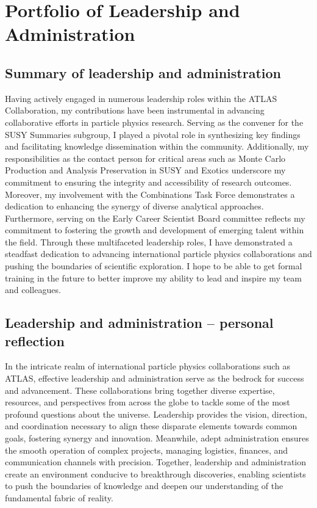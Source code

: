 \chapter{Portfolio of Leadership and Administration}

\section{Summary of leadership and administration} \label{sec:summary-of-leadership-and-administration}

Having actively engaged in numerous leadership roles within the ATLAS Collaboration, my contributions have been instrumental in advancing collaborative efforts in particle physics research. Serving as the convener for the SUSY Summaries subgroup, I played a pivotal role in synthesizing key findings and facilitating knowledge dissemination within the community. Additionally, my responsibilities as the contact person for critical areas such as Monte Carlo Production and Analysis Preservation in SUSY and Exotics underscore my commitment to ensuring the integrity and accessibility of research outcomes. Moreover, my involvement with the Combinations Task Force demonstrates a dedication to enhancing the synergy of diverse analytical approaches. Furthermore, serving on the Early Career Scientist Board committee reflects my commitment to fostering the growth and development of emerging talent within the field. Through these multifaceted leadership roles, I have demonstrated a steadfast dedication to advancing international particle physics collaborations and pushing the boundaries of scientific exploration. I hope to be able to get formal training in the future to better improve my ability to lead and inspire my team and colleagues.

\section{Leadership and administration -- personal reflection} \label{sec:leadership-and-administration-personal-reflection}

In the intricate realm of international particle physics collaborations such as ATLAS, effective leadership and administration serve as the bedrock for success and advancement. These collaborations bring together diverse expertise, resources, and perspectives from across the globe to tackle some of the most profound questions about the universe. Leadership provides the vision, direction, and coordination necessary to align these disparate elements towards common goals, fostering synergy and innovation. Meanwhile, adept administration ensures the smooth operation of complex projects, managing logistics, finances, and communication channels with precision. Together, leadership and administration create an environment conducive to breakthrough discoveries, enabling scientists to push the boundaries of knowledge and deepen our understanding of the fundamental fabric of reality.

